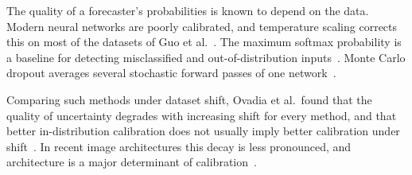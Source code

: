 The quality of a forecaster's probabilities is known to depend on the
data. Modern neural networks are poorly calibrated, and temperature
scaling corrects this on most of the datasets of Guo
et al.~\cite{guo2017calibration}.
The maximum softmax probability is a baseline for detecting
misclassified and out-of-distribution
inputs~\cite{hendrycks2017baseline}.
Monte Carlo dropout averages several stochastic forward passes of one
network~\cite{gal2016dropout}.

Comparing such methods under dataset shift, Ovadia et al.\ found that
the quality of uncertainty degrades with increasing shift for every
method, and that better in-distribution calibration does not usually
imply better calibration under shift~\cite{ovadia2019trust}.
In recent image architectures this decay is less pronounced, and
architecture is a major determinant of
calibration~\cite{minderer2021revisiting}.

